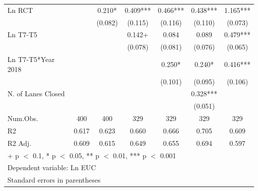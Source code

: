 \documentclass[
  letterpaper,
  authoryear]{elsarticle}
\begin{document}
\begin{table}
{\begin{tabular}[t]{lcccccc}
Ln RCT &  & 0.210* & 0.409*** & 0.466*** & 0.438*** & 1.165***\\
 &  & (0.082) & (0.115) & (0.116) & (0.110) & (0.073)\\
Ln T7-T5 &  &  & 0.142+ & 0.084 & 0.089 & 0.479***\\
 &  &  & (0.078) & (0.081) & (0.076) & (0.065)\\
Ln T7-T5*Year 2018 &  &  &  & 0.250* & 0.240* & 0.416***\\
 &  &  &  & (0.101) & (0.095) & (0.106)\\
N. of Lanes Closed &  &  &  &  & 0.328*** & \\
 &  &  &  &  & (0.051) & \\
\midrule
Num.Obs. & 400 & 400 & 329 & 329 & 329 & 329\\
R2 & 0.617 & 0.623 & 0.660 & 0.666 & 0.705 & 0.609\\
R2 Adj. & 0.609 & 0.615 & 0.649 & 0.655 & 0.694 & 0.597\\
\bottomrule
\multicolumn{7}{l}{\rule{0pt}{1em}+ p $<$ 0.1, * p $<$ 0.05, ** p $<$ 0.01, *** p $<$ 0.001}\\
\multicolumn{7}{l}{\rule{0pt}{1em}Dependent variable: Ln EUC}\\
\multicolumn{7}{l}{\rule{0pt}{1em}Standard errors in parentheses}\\
\end{tabular}

}

\end{table}%
\end{document}
